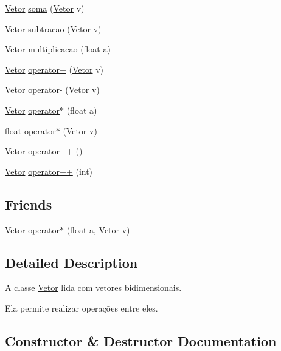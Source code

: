 \begin{DoxyCompactItemize}
\hyperlink{class_vetor}{Vetor} \hyperlink{class_vetor_a32c6e9bcc96a7d54b3b2fe1d3c0d84c1}{soma} (\hyperlink{class_vetor}{Vetor} v)
\item 
\hyperlink{class_vetor}{Vetor} \hyperlink{class_vetor_aab0e480dfe6eaa15a5f58b1f44efcdb5}{subtracao} (\hyperlink{class_vetor}{Vetor} v)
\item 
\hyperlink{class_vetor}{Vetor} \hyperlink{class_vetor_a3d3822b8ee1525b724b15db40d798ec7}{multiplicacao} (float a)
\item 
\hyperlink{class_vetor}{Vetor} \hyperlink{class_vetor_a6c98e035c2164efb70c1e4158ff3a30e}{operator+} (\hyperlink{class_vetor}{Vetor} v)
\item 
\hyperlink{class_vetor}{Vetor} \hyperlink{class_vetor_a7e778b3bcf5c142316efc40922f325ff}{operator-\/} (\hyperlink{class_vetor}{Vetor} v)
\item 
\hyperlink{class_vetor}{Vetor} \hyperlink{class_vetor_a02b8c1a9f2d9d9701e553e4d31a3b841}{operator$\ast$} (float a)
\item 
float \hyperlink{class_vetor_ae632976a4d2f4e0479999f20a085843e}{operator$\ast$} (\hyperlink{class_vetor}{Vetor} v)
\item 
\hyperlink{class_vetor}{Vetor} \hyperlink{class_vetor_a57108f1730fe7b165e481fcc67e41d74}{operator++} ()
\item 
\hyperlink{class_vetor}{Vetor} \hyperlink{class_vetor_ac542166c6ef82d5d0f10e8a70242ed81}{operator++} (int)
\end{DoxyCompactItemize}
\subsection*{Friends}
\begin{DoxyCompactItemize}
\item 
\hyperlink{class_vetor}{Vetor} \hyperlink{class_vetor_a94de46a0867046d0a49eb7e47b6d8e36}{operator$\ast$} (float a, \hyperlink{class_vetor}{Vetor} v)
\end{DoxyCompactItemize}


\subsection{Detailed Description}
A classe \hyperlink{class_vetor}{Vetor} lida com vetores bidimensionais. 

Ela permite realizar operações entre eles. 

\subsection{Constructor \& Destructor Documentation}
\mbox{\label{class_vetor_a475c943b2c1db890afc6c7958edea303}} 
